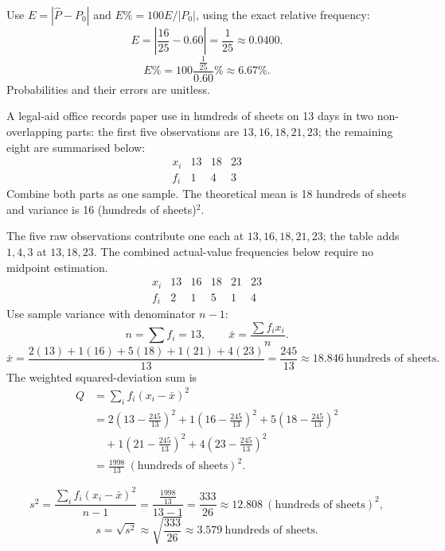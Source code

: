 Use $E=|\widehat P-P_0|$ and $E\%=100E/|P_0|$, using the exact relative frequency:
\[E=\left|\frac{16}{25}-0.60\right|=\frac{1}{25}\approx0.0400.\]
\[E\%=100\frac{\frac{1}{25}}{0.60}\%\approx6.67\%.\]
Probabilities and their errors are unitless.

A legal-aid office records paper use in hundreds of sheets on 13 days in two non-overlapping parts: the first five observations are $13,16,18,21,23$; the remaining eight are summarised below:
\[\begin{array}{c|rrr}x_i&13&18&23\\\hline f_i&1&4&3\end{array}\]
Combine both parts as one sample. The theoretical mean is 18 hundreds of sheets and variance is 16 (hundreds of sheets)$^2$.


The five raw observations contribute one each at $13,16,18,21,23$; the table adds $1,4,3$ at $13,18,23$. The combined actual-value frequencies below require no midpoint estimation.\[\begin{array}{c|rrrrr}x_i&13&16&18&21&23\\\hline f_i&2&1&5&1&4\end{array}\]
Use sample variance with denominator $n-1$:
\[n=\sum f_i=13,\qquad\bar x=\frac{\sum f_ix_i}{n}.\]
\[\bar x=\frac{2(13)+1(16)+5(18)+1(21)+4(23)}{13}=\frac{245}{13}\approx18.846\ \text{hundreds of sheets}.\]
The weighted squared-deviation sum is
\[\begin{aligned}Q&=\sum_i f_i(x_i-\bar x)^2\\&=2\left(13-\frac{245}{13}\right)^2+1\left(16-\frac{245}{13}\right)^2+5\left(18-\frac{245}{13}\right)^2\\&\quad+1\left(21-\frac{245}{13}\right)^2+4\left(23-\frac{245}{13}\right)^2\\&=\frac{1998}{13}\ (\text{hundreds of sheets})^2.\end{aligned}\]
\begin{samepage}
\[s^2=\frac{\sum_i f_i(x_i-\bar x)^2}{n-1}=\frac{\frac{1998}{13}}{13-1}=\frac{333}{26}\approx12.808\ (\text{hundreds of sheets})^2,\]
\[s=\sqrt{s^2}\approx\sqrt{\frac{333}{26}}\approx3.579\ \text{hundreds of sheets}.\]
\end{samepage}

